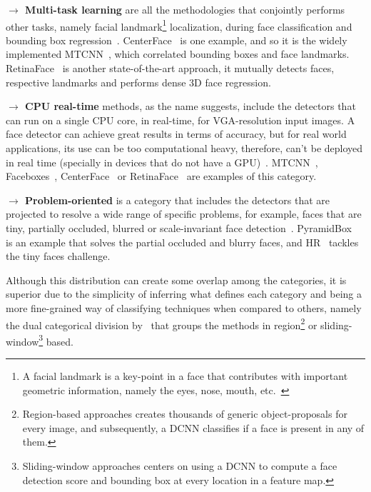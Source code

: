 \documentclass[class=report, crop=false, a4paper, 12pt]{standalone}
\begin{document}
\vspace{0.7\baselineskip}
\label{mt learning}
\noindent\textbf{$\rightarrow$ Multi-task learning} are all the methodologies that conjointly performs other tasks, namely facial landmark\footnote{A facial landmark is a key-point in a face that contributes with important geometric information, namely the eyes, nose, mouth, etc.~\autocite{fengWingLossRobust2018}} localization, during face classification and bounding box regression~\autocite{duElementsEndtoendDeep2022}. CenterFace~\autocite{xuCenterFaceJointFace2019} is one example, and so it is the widely implemented MTCNN~\autocite{zhangJointFaceDetection2016a}, which correlated bounding boxes and face landmarks. RetinaFace~\autocite{dengRetinaFaceSinglestageDense2019} is another state-of-the-art approach, it mutually detects faces, respective landmarks and performs dense 3D face regression.

\vspace{0.7\baselineskip}
\noindent\textbf{$\rightarrow$ CPU real-time} methods, as the name suggests, include the detectors that can run on a single CPU core, in real-time, for VGA-resolution input images. A face detector can achieve great results in terms of accuracy, but for real world applications, its use can be too computational heavy, therefore, can't be deployed in real time (specially in devices that do not have a GPU)~\autocite{duElementsEndtoendDeep2022}. MTCNN~\autocite{zhangJointFaceDetection2016a}, Faceboxes~\autocite{zhangFaceBoxesCPURealtime2018}, CenterFace~\autocite{xuCenterFaceJointFace2019} or RetinaFace~\autocite{dengRetinaFaceSinglestageDense2019} are examples of this category.

\vspace{0.7\baselineskip}
\noindent\textbf{$\rightarrow$ Problem-oriented} is a category that includes the detectors that are projected to resolve a wide range of specific problems, for example, faces that are tiny, partially occluded, blurred or scale-invariant face detection~\autocite{duElementsEndtoendDeep2022}. PyramidBox~\autocite{tangPyramidBoxContextassistedSingle2018} is an example that solves the partial occluded and blurry faces, and HR~\autocite{huFindingTinyFaces2017} tackles the tiny faces challenge.

\vspace{0.7\baselineskip}
Although this distribution can create some overlap among the categories, it is superior due to the simplicity of inferring what defines each category and being a more fine-grained way of classifying techniques when compared to others, namely the dual categorical division by~\autocite{ranjanDeepLearningUnderstanding2018} that groups the methods in region\footnote{Region-based approaches creates thousands of generic object-proposals for every image, and subsequently, a DCNN classifies if a face is present in any of them.} or sliding-window\footnote{Sliding-window approaches centers on using a DCNN to compute a face detection score and bounding box at every location in a feature map.} based. 
\end{document}
